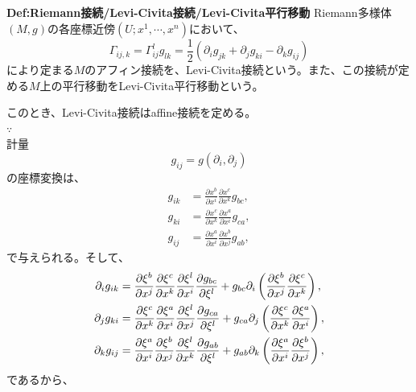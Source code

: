 \documentclass[a4paper,11pt]{jsarticle}
\numberwithin{equation}{section}
\begin{document}
\begin{itembox}[l]{\textbf{Def:Riemann接続/Levi-Civita接続/Levi-Civita平行移動}}
    Riemann多様体$(M,g)$の各座標近傍$(U;x^1,\cdots,x^n)$において、
    \begin{equation}
        \Gamma_{ij,k} = \Gamma_{ij}^l g_{lk}=\frac{1}{2}(\partial_i g_{jk} + \partial_j g_{ki} - \partial_k g_{ij})
    \end{equation}
    により定まる$M$のアフィン接続を、Levi-Civita接続という。また、この接続が定める$M$上の平行移動をLevi-Civita平行移動という。  

\end{itembox}

このとき、Levi-Civita接続はaffine接続を定める。\\
$\because$\\
計量
\begin{equation}
    g_{ij} = g(\partial_i,\partial_j)
\end{equation}
の座標変換は、
\[
\begin{aligned}
g_{ik} &= \frac{\partial x^b}{\partial x^i} \frac{\partial x^c}{\partial x^k} g_{bc}, \\
g_{ki} &= \frac{\partial x^c}{\partial x^k} \frac{\partial x^a}{\partial x^i} g_{ca}, \\
g_{ij} &= \frac{\partial x^a}{\partial x^i} \frac{\partial x^b}{\partial x^j} g_{ab},
\end{aligned}
\]
で与えられる。そして、
\begin{align}
\begin{aligned}
\partial_i g_{ik} &= \pdv{\xi^b}{x^j} \pdv{\xi^c}{x^k} \pdv{\xi^l}{x^i} \pdv{g_{bc}}{\xi^l} + g_{bc} \partial_i \left( \pdv{\xi^b}{x^j} \pdv{\xi^c}{x^k} \right), \\
\partial_j g_{ki} &= \pdv{\xi^c}{x^k} \pdv{\xi^a}{x^i} \pdv{\xi^l}{x^j} \pdv{g_{ca}}{\xi^l} + g_{ca} \partial_j \left( \pdv{\xi^c}{x^k} \pdv{\xi^a}{x^i} \right), \\
\partial_k g_{ij} &= \pdv{\xi^a}{x^i} \pdv{\xi^b}{x^j} \pdv{\xi^l}{x^k} \pdv{g_{ab}}{\xi^l} + g_{ab} \partial_k \left( \pdv{\xi^a}{x^i} \pdv{\xi^b}{x^j} \right),
\end{aligned}
\end{align}
であるから、
\end{document}
